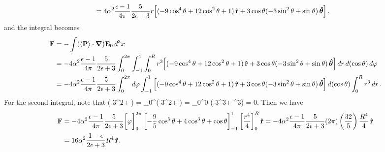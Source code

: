 \begin{solution}
\begin{align*}
		&= 4\alpha^2  \frac{\epsilon - 1}{4\pi} \frac{5}{2\epsilon + 3} r \!\left[ (-9\cos^4\theta + 12\cos^2\theta + 1) \,\vb{\hat{r}} + 3 \cos\theta (-3\sin^2\theta + \sin\theta) \,\boldsymbol{\hat{\theta}} \right],
	\end{align*}
	and the integral becomes
	\begin{align*}
		\vF &= -\int (\evP \cdot \grad) \vEo \dcx \\
		&= -4\alp^2  \frac{\eps - 1}{4\pi} \frac{5}{2\eps + 3} \intotp \intono \intoR r^3 \!\left[ (-9\cos^4\tht + 12\cos^2\tht + 1) \,\rh + 3 \cost (-3\sin^2\tht + \sint) \,\thh \right] \dr \dct \dph \\
		&= -4\alp^2 \frac{\eps - 1}{4\pi} \frac{5}{2\eps + 3} \intotp \dph \intono \left[ (-9\cos^4\tht + 12\cos^2\tht + 1) \,\rh + 3 \cost (-3\sin^2\tht + \sint) \,\thh \right] \dct \intoR r^3 \dr.
	\end{align*}
	For the second integral, note that
	\beq
		\intono \cost (-3\sin^2\tht + \sint) \dct
		= \int_0^\pi \cost \sint (-3\sin^2\tht + \sint) \dd{\tht}
		= \int_0^0 (-3\sin^3\tht + \sin^3\tht) \dd{(\sint)}
		= 0.
	\eeq
	Then we have
	\begin{align*}
		\vb{F} &= -4\alpha^2 \frac{\epsilon - 1}{4\pi} \frac{5}{2\epsilon + 3} \bigg[ \varphi \bigg]_0^{2\pi} \left[ -\frac{9}{5} \cos^5\theta + 4 \cos^3\theta + \cos\theta \right]_{-1}^1 \left[ \frac{r^4}{4} \right]_0^R \vb{\hat{r}}
		= -4\alpha^2 \frac{\epsilon - 1}{4\pi} \frac{5}{2\epsilon + 3} (2\pi) \left( \frac{32}{5} \right) \frac{R^4}{4} \,\vb{\hat{r}} \\
		&= 16 \alpha^2 \frac{1 - \epsilon}{2\epsilon + 3} R^4 \,\vb{\hat{r}}.
	\end{align*}
\end{solution}
\vfix